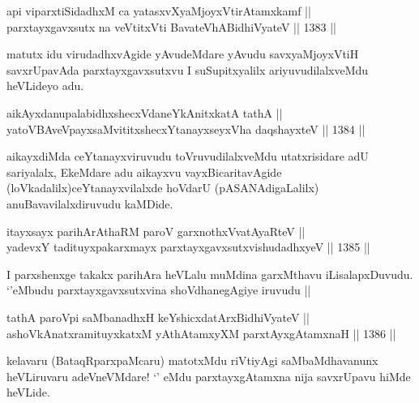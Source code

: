 \begin{shl}
api viparxtiSidadhxM ca yatasxvXyaMjoyxVtirAtamxkamf || \\
parxtayxgavxsutx na veVtitxVti BavateVhABidhiVyateV \hfill || 1383 ||  
\end{shl}

\begin{artha}
matutx idu virudadhxvAgide yAvudeMdare yAvudu savxyaMjoyxVtiH savxrUpavAda parxtayxgavxsutxvu I suSupitxyalilx ariyuvudilalxveMdu heVLideyo adu.
\end{artha}


\begin{shl}
aikAyxdanupalabidhxshecxVdaneYkAnitxkatA tathA || \\
yatoV\s BAveV\s payxsaMvititxshecxYtanayxseyxVha daqshayxteV \hfill || 1384 ||  
\end{shl}

\begin{artha}
aikayxdiMda ceYtanayxviruvudu toVruvudilalxveMdu utatxrisidare adU sariyalalx, EkeMdare adu aikayxvu vayxBicaritavAgide (loVkadalilx)ceYtanayxvilalxde hoVdarU (pASANAdigaLalilx) anuBavavilalxdiruvudu kaMDide.
\end{artha}


\begin{shl}
itayxsayx parihArAthaRM paroV garxnothxV\s vatAyaRteV || \\
yadevxY tadituyxpakarxmayx parxtayxgavxsutxvishudadhxyeV \hfill || 1385 ||  
\end{shl}


\begin{artha}
I parxshenxge takakx parihAra heVLalu muMdina garxMthavu iLisalapxDuvudu. `\stext'eMbudu parxtayxgavxsutxvina shoVdhanegAgiye iruvudu ||
\end{artha}


\begin{shl}
tathA paroV\s pi saMbanadhxH keYshicxdatArxBidhiVyateV || \\
ashoVkAnatxramituyxkatxM yAthAtamxyXM parxtAyxgAtamxnaH \hfill || 1386 ||  
\end{shl}

\begin{artha}
kelavaru (BataqRparxpaMcaru) matotxMdu riVtiyAgi saMbaMdhavanunx heVLiruvaru adeVneVMdare! `\stext' eMdu parxtayxgAtamxna nija savxrUpavu hiMde heVLide.
\end{artha}


